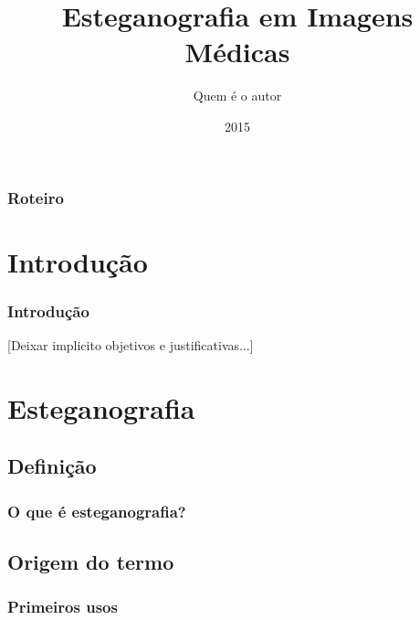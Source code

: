 \documentclass{beamer}
\title{Esteganografia em Imagens Médicas} %
\author{Quem é o autor} %
\institute[USP] %
{
Orientador: Quem? \\ %
\medskip
\textit{} %
}
\date{2015} %
\begin{document}
\begin{frame}
\titlepage %
\end{frame}

\begin{frame}
\frametitle{Roteiro} %
\tableofcontents %
\end{frame}


\section{Introdução} 

\begin{frame}
\frametitle{Introdução}
[Deixar implicito objetivos e justificativas...]
\end{frame}



\section{Esteganografia}
\subsection{Definição}
\begin{frame}
\frametitle{O que é esteganografia?}

\end{frame}

\subsection{Origem do termo}
\begin{frame}
\frametitle{Primeiros usos}

\end{frame}
\end{document}
